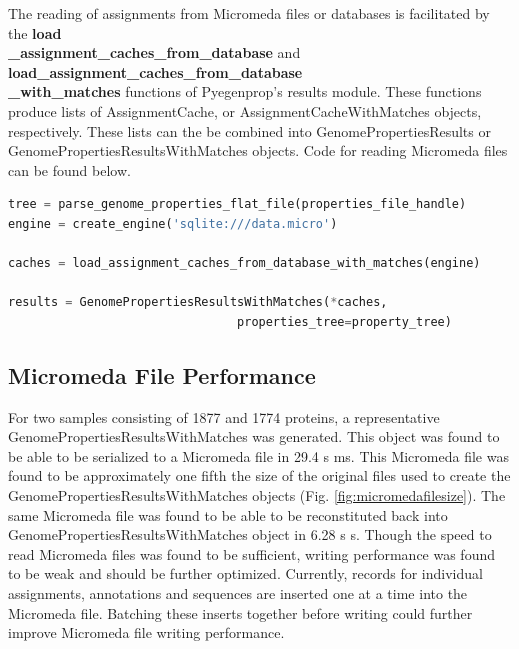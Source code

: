 The reading of assignments from Micromeda files or databases is facilitated by the \textbf{load\\ \_assignment\_caches\_from\_database} and \textbf{load\_assignment\_caches\_from\_database \\ \_with\_matches} functions of Pyegenprop's results module. These functions produce lists of AssignmentCache, or AssignmentCacheWithMatches objects, respectively. These lists can the be combined into GenomePropertiesResults or GenomePropertiesResultsWithMatches objects. Code for reading Micromeda files can be found below.

\begin{lstlisting}[language=Python]  
tree = parse_genome_properties_flat_file(properties_file_handle)
engine = create_engine('sqlite:///data.micro')

caches = load_assignment_caches_from_database_with_matches(engine)

results = GenomePropertiesResultsWithMatches(*caches,          
                                properties_tree=property_tree)
\end{lstlisting}

\subsection{Micromeda File Performance} \label{micromeda-file-performance}

For two samples consisting of 1877 and 1774 proteins, a representative GenomePropertiesResultsWithMatches was generated. This object was found to be able to be serialized to a Micromeda file in 29.4 s  ms. This Micromeda file was found to be approximately one fifth the size of the original files used to create the GenomePropertiesResultsWithMatches objects (Fig. \ref{fig:micromedafilesize}). The same Micromeda file was found to be able to be reconstituted back into GenomePropertiesResultsWithMatches object in 6.28 s  s. Though the speed to read Micromeda files was found to be sufficient, writing performance was found to be weak and should be further optimized. Currently, records for individual assignments, annotations and sequences are inserted one at a time into the Micromeda file. Batching these inserts together before writing could further improve Micromeda file writing performance.

